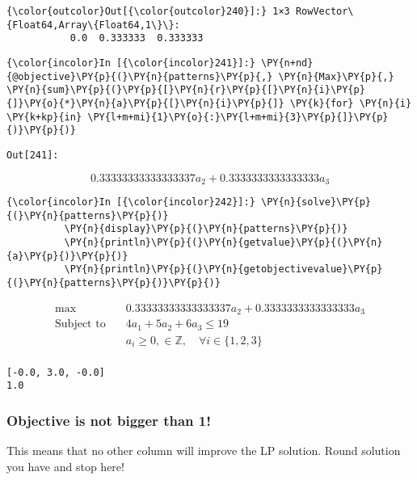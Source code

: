 \begin{Verbatim}[commandchars=\\\{\}]
{\color{outcolor}Out[{\color{outcolor}240}]:} 1×3 RowVector\{Float64,Array\{Float64,1\}\}:
           0.0  0.333333  0.333333
\end{Verbatim}
            
    \begin{Verbatim}[commandchars=\\\{\}]
{\color{incolor}In [{\color{incolor}241}]:} \PY{n+nd}{@objective}\PY{p}{(}\PY{n}{patterns}\PY{p}{,} \PY{n}{Max}\PY{p}{,} \PY{n}{sum}\PY{p}{(}\PY{p}{[}\PY{n}{r}\PY{p}{[}\PY{n}{i}\PY{p}{]}\PY{o}{*}\PY{n}{a}\PY{p}{[}\PY{n}{i}\PY{p}{]} \PY{k}{for} \PY{n}{i} \PY{k+kp}{in} \PY{l+m+mi}{1}\PY{o}{:}\PY{l+m+mi}{3}\PY{p}{]}\PY{p}{)}\PY{p}{)}
\end{Verbatim}

\texttt{\color{outcolor}Out[{\color{outcolor}241}]:}
    
    $$ 0.33333333333333337 a_{2} + 0.3333333333333333 a_{3} $$

    

    \begin{Verbatim}[commandchars=\\\{\}]
{\color{incolor}In [{\color{incolor}242}]:} \PY{n}{solve}\PY{p}{(}\PY{n}{patterns}\PY{p}{)}
          \PY{n}{display}\PY{p}{(}\PY{n}{patterns}\PY{p}{)}
          \PY{n}{println}\PY{p}{(}\PY{n}{getvalue}\PY{p}{(}\PY{n}{a}\PY{p}{)}\PY{p}{)}
          \PY{n}{println}\PY{p}{(}\PY{n}{getobjectivevalue}\PY{p}{(}\PY{n}{patterns}\PY{p}{)}\PY{p}{)}
\end{Verbatim}


  \begin{equation} \begin{split}\max\quad & 0.33333333333333337 a_{2} + 0.3333333333333333 a_{3}\\
\text{Subject to} \quad & 4 a_{1} + 5 a_{2} + 6 a_{3} \leq 19\\
 & a_{i} \geq 0, \in \mathbb{Z}, \quad\forall i \in \{1,2,3\}\\
\end{split}
\end{equation}

    
    \begin{Verbatim}[commandchars=\\\{\}]
[-0.0, 3.0, -0.0]
1.0

    \end{Verbatim}

    \hypertarget{yay-objective-is-not-bigger-than-1}{%
\subsubsection{Objective is not bigger than
1!}\label{yay-objective-is-not-bigger-than-1}}

This means that no other column will improve the LP solution. Round
solution you have and stop here!


    